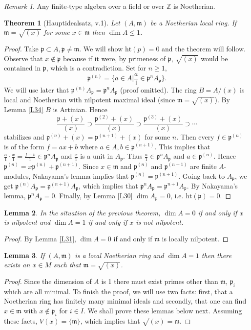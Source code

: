 \documentclass{article}
\newcommand{\Z}{\mathbb{Z}}
\newcommand{\fr}{\mathfrak}
\theoremstyle{plain}
\newtheorem{thm}{Theorem}
\newtheorem{lem}[thm]{Lemma}
\theoremstyle{definition}
\theoremstyle{remark}
\newtheorem*{rem}{Remark}
\begin{document}
\begin{rem}
Any finite-type algebra over a field or over $\Z$ is Noetherian.
\end{rem}

\begin{thm}[Hauptidealsatz, v.1]
\label{L36}
Let $(A,\fr m)$ be a Noetherian local ring. If $\fr m=\sqrt{(x)}$ for some $x\in\fr m$ then $\dim A\leq 1$.
\end{thm}
\begin{proof}
Take $\fr p\subset A, \fr p\neq\fr m$. We will show $\text{ht}(p)=0$ and the theorem will follow. Observe that $x\notin\fr p$ because if it were, by primeness of $\fr p$, $\sqrt{(x)}$ would be contained in $\fr p$, which is a contradiction. Set for $n\geq 1$,
\[\fr p^{(n)}=\{a\in A | \frac{a}{1}\in\fr p^nA_\fr p\}.\]
We will use later that $\fr p^{(n)}A_\fr p=\fr p^nA_\fr p$ (proof omitted). The ring $B=A/(x)$ is local and Noetherian with nilpotent maximal ideal (since $\fr m=\sqrt{(x)}$). By Lemma \ref{L34} $B$ is Artinian. Hence
\[\frac{\fr p+(x)}{(x)}\supset\frac{\fr p^{(2)}+(x)}{(x)}\supset\frac{\fr p^{(3)}+(x)}{(x)}\supset\cdots\]
stabilizes and $\fr p^{(n)}+(x)=\fr p^{(n+1)}+(x)$ for some $n$. Then every $f\in\fr p^{(n)}$ is of the form $f=ax+b$ where $a\in A,b\in\fr p^{(n+1)}$. This implies that $\frac{a}{1}\cdot\frac{x}{1}=\frac{f-b}{1}\in\fr p^nA_\fr p$ and $\frac{x}{1}$ is a unit in $A_\fr p$. Thus $\frac{a}{1}\in\fr p^nA_\fr p$ and $a\in\fr p^{(n)}$. Hence $\fr p^{(n)}=x\fr p^{(n)}+\fr p^{(n+1)}$. Since $x\in\fr m$ and $\fr p^{(n)}$ and $\fr p^{(n+1)}$ are finite $A$-modules, Nakayama's lemma implies that $\fr p^{(n)}=\fr p^{(n+1)}$. Going back to $A_\fr p$, we get $\fr p^{(n)}A_\fr p=\fr p^{(n+1)}A_\fr p$, which implies that $\fr p^nA_\fr p=\fr p^{n+1}A_\fr p$. By Nakayama's lemma, $\fr p^nA_\fr p=0$. Finally, by Lemma \ref{L30} $\dim A_\fr p=0$, i.e. $\text{ht}(\fr p)=0$.
\end{proof}

\begin{lem}
\label{L37}
In the situation of the previous theorem, $\dim A=0$ if and only if $x$ is nilpotent and $\dim A=1$ if and only if $x$ is not nilpotent.
\end{lem}
\begin{proof}
By Lemma \ref{L31}, $\dim A=0$ if and only if $\fr m$ is locally nilpotent.
\end{proof}

\begin{lem}
\label{L38}
If $(A,\fr m)$ is a local Noetherian ring and $\dim A=1$ then there exists an $x\in M$ such that $\fr m=\sqrt{(x)}$.
\end{lem}
\begin{proof}
Since the dimension of $A$ is 1 there must exist primes other than $\fr m$, $\fr p_i$ which are all minimal. To finish the proof, we will use two facts: first, that a Noetherian ring has finitely many minimal ideals and secondly, that one can find $x\in\fr m$ with $x\notin\fr p_i$ for $i\in I$. We shall prove these lemmas below next. Assuming these facts, $V(x)=\{\fr m\}$, which implies that $\sqrt{(x)}=\fr m$.
\end{proof}
\end{document}

